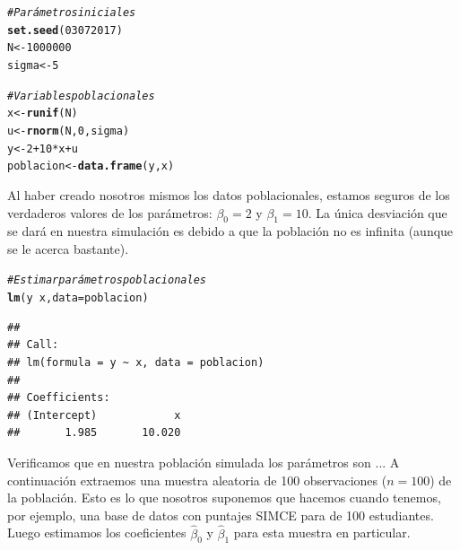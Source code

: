 \documentclass{report}\usepackage[]{graphicx}\usepackage[]{color}
\makeatletter
\newcommand{\hlnum}[1]{\textcolor[rgb]{0.686,0.059,0.569}{#1}}%
\newcommand{\hlcom}[1]{\textcolor[rgb]{0.678,0.584,0.686}{\textit{#1}}}%
\newcommand{\hlopt}[1]{\textcolor[rgb]{0,0,0}{#1}}%
\newcommand{\hlstd}[1]{\textcolor[rgb]{0.345,0.345,0.345}{#1}}%
\newcommand{\hlkwb}[1]{\textcolor[rgb]{0.69,0.353,0.396}{#1}}%
\newcommand{\hlkwc}[1]{\textcolor[rgb]{0.333,0.667,0.333}{#1}}%
\newcommand{\hlkwd}[1]{\textcolor[rgb]{0.737,0.353,0.396}{\textbf{#1}}}%
\newenvironment{kframe}{%
 \def\at@end@of@kframe{}%
 \ifinner\ifhmode%
  \def\at@end@of@kframe{\end{minipage}}%
  \begin{minipage}{\columnwidth}%
 \fi\fi%
 \def\FrameCommand##1{\hskip\@totalleftmargin \hskip-\fboxsep
 \colorbox{shadecolor}{##1}\hskip-\fboxsep
     \hskip-\linewidth \hskip-\@totalleftmargin \hskip\columnwidth}%
 \MakeFramed {\advance\hsize-\width
   \@totalleftmargin\z@ \linewidth\hsize
   \@setminipage}}%
 {\par\unskip\endMakeFramed%
 \at@end@of@kframe}
\newenvironment{knitrout}{}{} %
\makeatother
\begin{document}
\begin{knitrout}
\color{fgcolor}\begin{kframe}
\begin{alltt}
\hlcom{# Parámetros iniciales}
\hlkwd{set.seed}\hlstd{(}\hlnum{03072017}\hlstd{)}
\hlstd{N} \hlkwb{<-} \hlnum{1000000}
\hlstd{sigma} \hlkwb{<-} \hlnum{5}

\hlcom{# Variables poblacionales}
\hlstd{x} \hlkwb{<-} \hlkwd{runif}\hlstd{(N)}
\hlstd{u} \hlkwb{<-} \hlkwd{rnorm}\hlstd{(N,} \hlnum{0}\hlstd{, sigma)}
\hlstd{y} \hlkwb{<-} \hlnum{2} \hlopt{+} \hlnum{10}\hlopt{*}\hlstd{x} \hlopt{+} \hlstd{u}
\hlstd{poblacion} \hlkwb{<-} \hlkwd{data.frame}\hlstd{(y,x)}
\end{alltt}
\end{kframe}
\end{knitrout}

Al haber creado nosotros mismos los datos poblacionales, estamos seguros de los verdaderos valores de los parámetros: $\beta_0=2$ y $\beta_1=10$. La única desviación que se dará en nuestra simulación es debido a que la población no es infinita (aunque se le acerca bastante).

\begin{knitrout}
\color{fgcolor}\begin{kframe}
\begin{alltt}
\hlcom{# Estimar parámetros poblacionales}
\hlkwd{lm}\hlstd{(y}\hlopt{~}\hlstd{x,} \hlkwc{data} \hlstd{= poblacion)}
\end{alltt}
\begin{verbatim}
## 
## Call:
## lm(formula = y ~ x, data = poblacion)
## 
## Coefficients:
## (Intercept)            x  
##       1.985       10.020
\end{verbatim}
\end{kframe}
\end{knitrout}

Verificamos que en nuestra población simulada los parámetros son ...
A continuación extraemos una muestra aleatoria de 100 observaciones ($n=100$) de la población. Esto es lo que nosotros suponemos que hacemos cuando tenemos, por ejemplo, una base de datos con puntajes SIMCE para de 100 estudiantes.
Luego estimamos los coeficientes $\hat\beta_0$ y $\hat\beta_1$ para esta muestra en particular.
\end{document}
